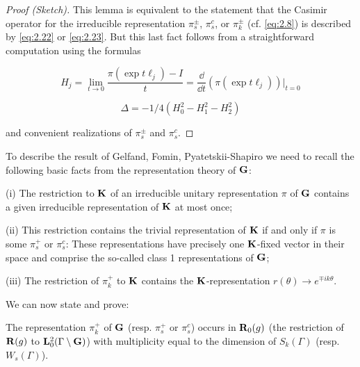 \begin{proof}[Proof (Sketch)]

This lemma is equivalent to the statement that the Casimir operator for the irreducible representation $\pi_s^{\pm}$, $\pi_s^{c}$, or $\pi_k^{\pm}$ (cf. \eqref{eq:2.8}) is described by \eqref{eq:2.22} or \eqref{eq:2.23}. But this last fact follows from a straightforward computation using the formulas

\[
H_j = \lim_{t \to 0} \frac{\pi(\exp t\ell_j) - I}{t} = \frac{\dd}{\dd t}\left(\pi(\exp t\ell_j)\right)\big|_{t = 0}
\]

\[
\Delta = -1/4\left(H_0^2 - H_1^2 - H_2^2\right)
\]

and convenient realizations of $\pi_s^{\pm}$ and $\pi_s^{c}$.

\end{proof}

To describe the result of Gelfand, Fomin, Pyatetskii-Shapiro we need to recall the following basic facts from the representation theory of $\mathbf{G}$:

(i) The restriction to $\mathbf{K}$ of an irreducible unitary representation $\pi$ of $\mathbf{G}$ contains a given irreducible representation of $\mathbf{K}$ at most once;

(ii) This restriction contains the trivial representation of $\mathbf{K}$ if and only if $\pi$ is some $\pi_s^{+}$ or $\pi_s^{c}$: These representations have precisely one $\mathbf{K}$-fixed vector in their space and comprise the so-called class 1 representations of $\mathbf{G}$;

(iii) The restriction of $\pi_k^{+}$ to $\mathbf{K}$ contains the $\mathbf{K}$-representation $r(\theta) \to e^{\mp ik\theta}$.

We can now state and prove:

\begin{theorem}\label{thm:2.10}

The representation $\pi_k^{+}$ of $\mathbf{G}$ (resp. $\pi_s^{+}$ or $\pi_s^{c}$) occurs in $\mathbf{R}_0(g)$ (the restriction of $\mathbf{R}(g)$ to $\mathbf{L}_0^2(\Gamma \setminus \mathbf{G})$) with multiplicity equal to the dimension of $S_k(\Gamma)$ (resp. $W_s(\Gamma)$).

\end{theorem}

